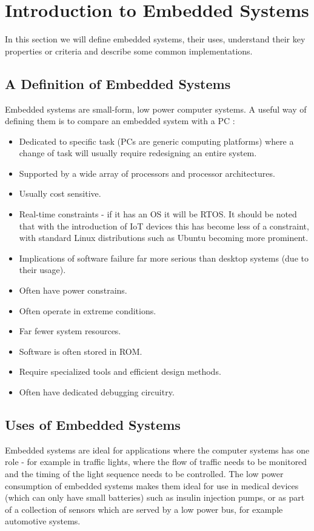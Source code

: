 \section{Introduction to Embedded Systems}

In this section we will define embedded systems, their uses, understand their key properties or criteria and describe some common implementations.


\subsection{A Definition of Embedded Systems}

Embedded systems are small-form, low power computer systems. A useful way of defining them is to compare an embedded system with a PC \cite{BergerArnold2002Esd:}:
\begin{itemize}
\item Dedicated to specific task (PCs are generic computing platforms) where a change of task will usually require redesigning an entire system.
\item Supported by a wide array of processors and processor architectures.
\item Usually cost sensitive.
\item Real-time constraints - if it has an OS it will be RTOS. It should be noted that with the introduction of IoT devices this has become less of a constraint, with standard Linux distributions such as Ubuntu becoming more prominent.
\item Implications of software failure far more serious than desktop systems (due to their usage).
\item Often have power constrains.
\item Often operate in extreme conditions.
\item Far fewer system resources.
\item Software is often stored in ROM.
\item Require specialized tools and efficient design methods.
\item Often have dedicated debugging circuitry.
\end{itemize}

\subsection{Uses of Embedded Systems}\label{usesEmbeddedSystems}

Embedded systems are ideal for applications where the computer systems has one role - for example in traffic lights, where the flow of traffic needs to be monitored and the timing of the light sequence needs to be controlled. The low power consumption of embedded systems makes them ideal for use in medical devices (which can only have small batteries) such as insulin injection pumps, or as part of a collection of sensors which are served by a low power bus, for example automotive systems.

